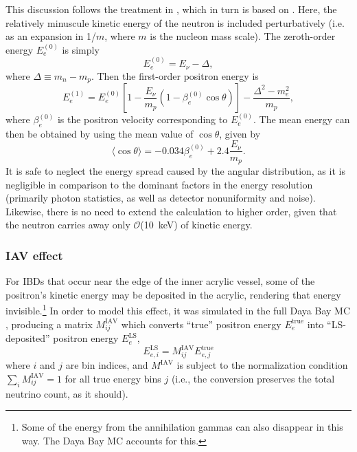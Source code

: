 \documentclass[../thesis.tex]{subfiles}
\begin{document}
This discussion follows the treatment in \cite{berkeley_toymc}, which in turn is based on \cite{Vogel_1999}. Here, the relatively minuscule kinetic energy of the neutron is included perturbatively (i.e. as an expansion in 1/$m$, where $m$ is the nucleon mass scale). The zeroth-order energy $E_e^{(0)}$ is simply
\begin{equation*}
  E_e^{(0)} = E_\nu - \Delta,
\end{equation*}
where $\Delta \equiv m_n - m_p$. Then the first-order positron energy is
\begin{equation*}
  E_e^{(1)} = E_e^{(0)} \left[ 1 - \frac{E_\nu}{m_p}(1 - \beta_e^{(0)}\cos\theta) \right]
  - \frac{\Delta^2 - m_e^2}{m_p},
\end{equation*}
where $\beta_e^{(0)}$ is the positron velocity corresponding to $E_e^{(0)}$. The mean energy can then be obtained by using the mean value of $\cos \theta$, given by \cite{Vogel_1999}
\begin{equation*}
  \langle \cos \theta \rangle = -0.034 \beta_e^{(0)} + 2.4 \frac{E_\nu}{m_p}.
\end{equation*}
It is safe to neglect the energy spread caused by the angular distribution, as it is negligible in comparison to the dominant factors in the energy resolution (primarily photon statistics, as well as detector nonuniformity and noise). Likewise, there is no need to extend the calculation to higher order, given that the neutron carries away only $\mathcal{O}$(10~keV) of kinetic energy.

\subsubsection{IAV effect}

\newcommand\Miav{M^{\mathrm{IAV}}}
\newcommand\Eetrue[1]{E^{\mathrm{true}}_{e#1}}
\newcommand\Eels[1]{E^{\mathrm{LS}}_{e#1}}

For IBDs that occur near the edge of the inner acrylic vessel, some of the positron's kinetic energy may be deposited in the acrylic, rendering that energy invisible.\footnote{Some of the energy from the annihilation gammas can also disappear in this way. The Daya Bay MC accounts for this.} In order to model this effect, it was simulated in the full Daya Bay MC \cite{TruePromptSpec}, producing a matrix $\Miav_{ij}$ which converts ``true'' positron energy $\Eetrue{}$ into ``LS-deposited'' positron energy $\Eels{}$,
\begin{equation*}
  \Eels{,i} = \Miav_{ij} \Eetrue{,j}
\end{equation*}
where $i$ and $j$ are bin indices, and $\Miav$ is subject to the normalization condition $\sum_i\Miav_{ij} = 1$ for all true energy bins $j$ (i.e., the conversion preserves the total neutrino count, as it should).
\end{document}
